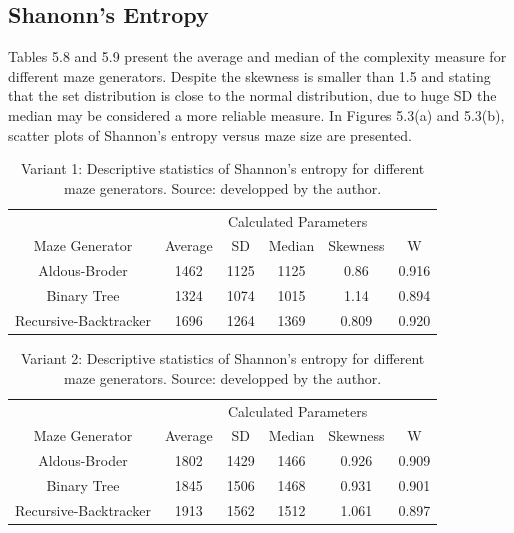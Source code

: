  \subsection{Shanonn's Entropy}
Tables 5.8 and 5.9 present the average and median of the complexity measure for different maze generators. Despite the skewness is smaller than 1.5 and stating that the set
distribution is close to the normal distribution, due to huge SD the median may be considered a more reliable measure. In Figures 5.3(a) and 5.3(b), scatter
plots of Shannon's entropy versus maze size are presented.\\

\begin{table}[!ht]
    \centering
    \caption{Variant 1: Descriptive statistics of Shannon's entropy for different maze generators. Source: developped by the author.} 
    \begin{tabular}{c c c c c c}
    \hline
        ~&\multicolumn{5}{c}{Calculated Parameters}\\
        Maze Generator & Average & SD & Median & Skewness & W\\ \hline \hline
        Aldous-Broder & 1462 & 1125 & 1125 & 0.86 & 0.916  \\ 
        Binary Tree & 1324 & 1074 & 1015 & 1.14 & 0.894  \\ 
        Recursive-Backtracker & 1696 & 1264 & 1369 & 0.809 & 0.920 \\ \hline
    \end{tabular}
\end{table}

\begin{table}[!ht]
    \centering
    \caption{Variant 2: Descriptive statistics of Shannon's entropy for different maze generators. Source: developped by the author.} 
    \begin{tabular}{cccccc}
    \hline
        ~&\multicolumn{5}{c}{Calculated Parameters}\\
        Maze Generator & Average & SD & Median & Skewness & W\\ \hline \hline
        Aldous-Broder & 1802 & 1429 & 1466 & 0.926 & 0.909 \\ 
        Binary Tree & 1845 & 1506 & 1468 & 0.931 & 0.901\\ 
        Recursive-Backtracker & 1913 & 1562 & 1512 & 1.061 & 0.897\\ \hline
    \end{tabular}
\end{table}

